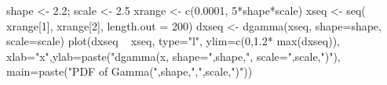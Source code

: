 \begin{Schunk}
\begin{Sinput}
  shape <- 2.2; scale <- 2.5
  xrange <- c(0.0001, 5*shape*scale)
  xseq <- seq( xrange[1], xrange[2], length.out = 200)
  dxseq <- dgamma(xseq, shape=shape, scale=scale)
  plot(dxseq ~ xseq, type="l", ylim=c(0,1.2* max(dxseq)), xlab="x",ylab=paste("dgamma(x, shape=",shape,", scale=",scale,")"), main=paste("PDF of Gamma(",shape,",",scale,")"))
\end{Sinput}
\end{Schunk}
